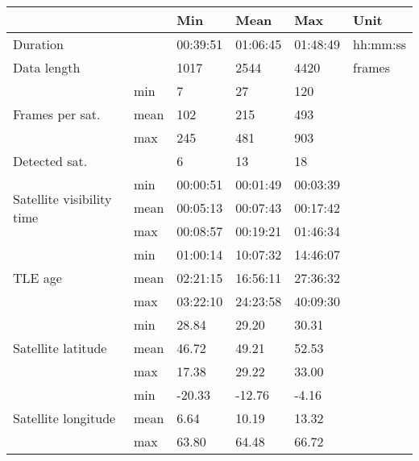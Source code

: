\begin{table}
    \centering
    \begin{tabular}{p{1in}l|llll}
                                            &        & Min     & Mean    & Max     & Unit\\ \hline \hline
Duration                                    &        & 00:39:51 & 01:06:45 & 01:48:49 & hh:mm:ss     \\ 
Data length                                 &        & 1017 & 2544 & 4420 & frames     \\  \hline
\multirow{3}{1in}{Frames per sat.}              &  min   & 7 & 27 & 120 &      \\ 
                                            &  mean  & 102 & 215 & 493 &      \\ 
                                            &  max   & 245 & 481 & 903 &      \\  \hline
Detected sat.                         &        & 6 & 13 & 18 &      \\  \hline
\multirow{3}{1in}{Satellite visibility  time}   &  min   & 00:00:51 & 00:01:49 & 00:03:39 &      \\ 
                                            &  mean  & 00:05:13 & 00:07:43 & 00:17:42 &      \\ 
                                            &  max   & 00:08:57 & 00:19:21 & 01:46:34 &      \\  \hline
\multirow{3}{1in}{TLE age}                      &  min   & 01:00:14 & 10:07:32 & 14:46:07 &      \\ 
                                            &  mean  & 02:21:15 & 16:56:11 & 27:36:32 &      \\ 
                                            &  max   & 03:22:10 & 24:23:58 & 40:09:30 &      \\  \hline
\multirow{3}{1in}{Satellite latitude}           &  min   & 28.84 & 29.20 & 30.31 &      \\ 
                                            &  mean  & 46.72 & 49.21 & 52.53 &      \\ 
                                            &  max   & 17.38 & 29.22 & 33.00 &      \\  \hline
\multirow{3}{1in}{Satellite longitude}      &  min   & -20.33 & -12.76 & -4.16 &      \\ 
                                            &  mean  & 6.64 & 10.19 & 13.32 &      \\ 
                                            &  max   & 63.80 & 64.48 & 66.72 &      \\  \hline

\end{tabular}
\end{table}
